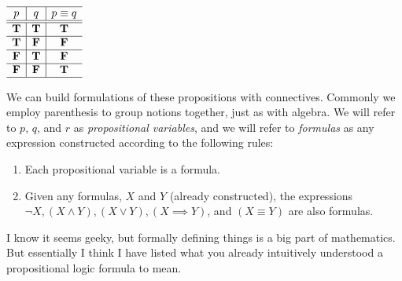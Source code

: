 \ifKey
\color{red}
\hfill 
 $  \begin{array}{c|c|c}
  \hline  
  p & q & p\equiv q\\
  \hline
  \hline
 \mathbf{T} &  \mathbf{T} &  \mathbf{T}\\
  \hline
 \mathbf{T} &  \mathbf{F} &  \mathbf{F}\\
  \hline
 \mathbf{F} &  \mathbf{T} &  \mathbf{F}\\
  \hline
 \mathbf{F} &  \mathbf{F} &  \mathbf{T}\\
    \hline
    \end{array}$
\color{black}
\fi
 
      
We can build formulations of these propositions with connectives.  Commonly we employ parenthesis to group notions together, just as with algebra.  We will refer to $p$, $q$, and $r$ as \emph{propositional variables}, and we will refer to \emph{formulas} as any expression constructed according to the following rules:
\begin{enumerate}
\item Each propositional variable is a formula.
\item Given any formulas, $X$ and $Y$ (already constructed), the expressions $\neg X, (X\land Y), (X\lor Y),  (X\implies Y)$, and $(X\equiv Y)$ are also formulas.
\end{enumerate}  


I know it seems geeky, but formally defining things is a big part of mathematics.  But essentially I think I have listed what you already intuitively understood a propositional logic formula to mean.  \smiley
  
